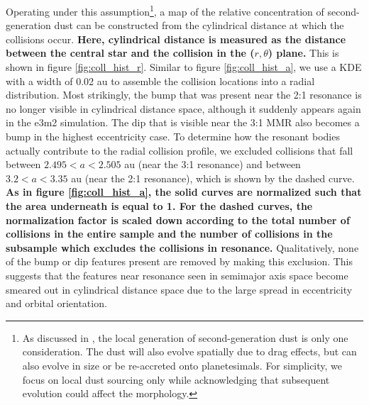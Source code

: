 \documentclass[fleqn,usenatbib]{mnras}
\begin{document}
Operating under this assumption\footnote{As discussed in \cite{2017ApJ...850..103B}, the local generation of second-generation dust is only one 
consideration.  The dust will also evolve spatially due to drag effects, but can also evolve in size or be re-accreted onto planetesimals. For simplicity, 
we focus on local dust sourcing only while acknowledging that subsequent evolution could affect the morphology.}, a map of the relative concentration 
of second-generation dust can be constructed from the cylindrical distance at which the collisions occur. \textbf{Here, cylindrical distance is measured as the distance between the central star and the collision in the ($r, \theta$) plane.} This is shown in figure \ref{fig:coll_hist_r}. 
Similar to figure \ref{fig:coll_hist_a}, we use a KDE with a width of 0.02 au to assemble the collision locations into a radial distribution. Most 
strikingly, the bump that was present near the 2:1 resonance is no longer visible in cylindrical distance space, although it suddenly appears again in 
the e3m2 simulation. The dip that is visible near the 3:1 MMR also becomes a bump in the highest eccentricity case. To determine how the resonant 
bodies actually contribute to the radial collision profile, we excluded collisions that fall between $2.495 < a < 2.505$ au (near the 3:1 resonance) and 
between $3.2 < a < 3.35$ au (near the 2:1 resonance), which is shown by the dashed curve. \textbf{As in figure \ref{fig:coll_hist_a}, the solid curves are normalized such that the area underneath is equal to 1. For the dashed curves, the normalization factor is scaled down according to the total number of collisions in the entire sample and the number of collisions in the subsample which excludes the collisions in resonance.} Qualitatively, none of the bump or dip features present 
are removed by making this exclusion. This suggests that the features near resonance seen in semimajor axis space become smeared out in 
cylindrical distance space due to the large spread in eccentricity and orbital orientation.
\end{document}
